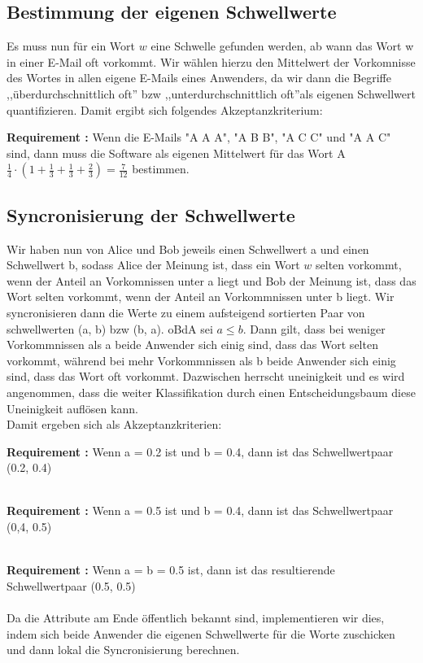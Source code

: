 \documentclass{article}
\newcounter{requirementscount}{}
\newcommand{\requirement}[1] {
        \addtocounter{requirementscount}{1}
        {\bf Requirement \therequirementscount:} #1\\
    }
\begin{document}
\subsection{Bestimmung der eigenen Schwellwerte}
Es muss nun f\"ur ein Wort \(w\) eine Schwelle gefunden werden, ab wann das
Wort w in einer E-Mail oft vorkommt. Wir w\"ahlen hierzu den Mittelwert
der Vorkomnisse des Wortes in allen eigene E-Mails eines Anwenders, da wir
dann die Begriffe ,,\"uberdurchschnittlich oft'' bzw ,,unterdurchschnittlich 
oft''als eigenen Schwellwert quantifizieren.
Damit ergibt sich folgendes Akzeptanzkriterium:\\
\requirement{Wenn die E-Mails "A A A", "A B B", "A C C" und "A A C" sind, dann
muss die Software als eigenen Mittelwert f\"ur das Wort A 
\(\frac{1}{4} \cdot (1 + \frac{1}{3} + \frac{1}{3} + \frac{2}{3}) = \frac{7}{12}\) bestimmen.}

\subsection{Syncronisierung der Schwellwerte}
Wir haben nun von Alice und Bob jeweils einen Schwellwert a und einen
Schwellwert b, sodass Alice der Meinung ist, dass ein Wort \(w\)
selten vorkommt, wenn der Anteil an Vorkomnissen unter a liegt und
Bob der Meinung ist, dass das Wort selten vorkommt, wenn der Anteil an
Vorkommnissen unter b liegt. Wir syncronisieren dann die Werte zu einem
aufsteigend sortierten Paar von schwellwerten (a, b) bzw (b, a). oBdA sei
\(a \leq b\). Dann gilt, dass bei weniger Vorkommnissen als a beide Anwender
sich einig sind, dass das Wort selten vorkommt, w\"ahrend bei mehr Vorkommnissen
als b beide Anwender sich einig sind, dass das Wort oft vorkommt. Dazwischen 
herrscht uneinigkeit und es wird angenommen, dass die weiter Klassifikation
durch einen Entscheidungsbaum diese Uneinigkeit aufl\"osen kann.\\
Damit ergeben sich als Akzeptanzkriterien:\\
\requirement{Wenn a = 0.2 ist und b = 0.4, dann ist das Schwellwertpaar
(0.2, 0.4)}\\
\requirement{Wenn a = 0.5 ist und b = 0.4, dann ist das Schwellwertpaar
(0,4, 0.5)}\\
\requirement{Wenn a = b = 0.5 ist, dann ist das resultierende Schwellwertpaar
(0.5, 0.5)}\\
Da die Attribute am Ende \"offentlich bekannt sind, implementieren wir
dies, indem sich beide Anwender die eigenen Schwellwerte f\"ur die Worte
zuschicken und dann lokal die Syncronisierung berechnen.
\end{document}
